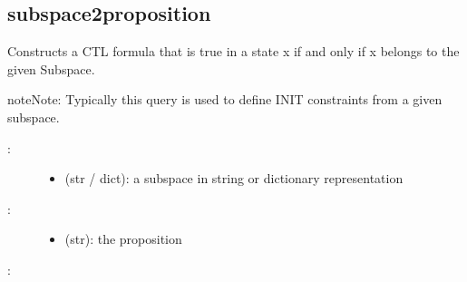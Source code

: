 \documentclass[letterpaper,10pt,english]{sphinxmanual}
\begin{document}
\subsection{subspace2proposition}
\label{\detokenize{QueryPatterns:subspace2proposition}}

\begin{fulllineitems}
\label{\detokenize{QueryPatterns:PyBoolNet.QueryPatterns.subspace2proposition}}
Constructs a CTL formula that is true in a state x if and only if x belongs to the given Subspace.

\begin{sphinxadmonition}{note}{Note:}
Typically this query is used to define INIT constraints from a given subspace.
\end{sphinxadmonition}
\begin{description}
\item[{:}] \leavevmode\begin{itemize}
\item {} 
 (str / dict): a subspace in string or dictionary representation

\end{itemize}

\item[{:}] \leavevmode\begin{itemize}
\item {} 
 (str): the proposition

\end{itemize}

\end{description}

:

\begin{sphinxVerbatim}[commandchars=\\\{\}]
  
    
\end{sphinxVerbatim}

\end{fulllineitems}
\end{document}
